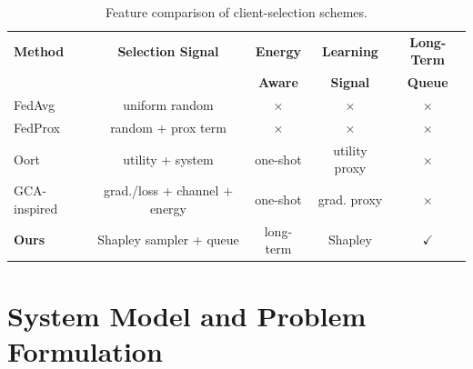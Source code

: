 \documentclass[journal]{IEEEtran}
\begin{document}
\begin{table}[t]
\centering
\caption{Feature comparison of client-selection schemes.}
\label{tab:related}
\scriptsize
\setlength{\tabcolsep}{2pt}
\begin{tabular}{l|c|c|c|c}
\hline
\textbf{Method} & \textbf{Selection Signal} & \textbf{Energy} & \textbf{Learning} & \textbf{Long-Term} \\
 & & \textbf{Aware} & \textbf{Signal} & \textbf{Queue} \\
\hline
FedAvg & uniform random & $\times$ & $\times$ & $\times$ \\
FedProx & random + prox term & $\times$ & $\times$ & $\times$ \\
Oort & utility + system & one-shot & utility proxy & $\times$ \\
GCA-inspired & grad./loss + channel + energy & one-shot & grad. proxy & $\times$ \\
\textbf{Ours} & Shapley sampler + queue & long-term & Shapley & $\checkmark$ \\
\hline
\end{tabular}
\end{table}

\section{System Model and Problem Formulation}
\label{sec:system}
\end{document}
